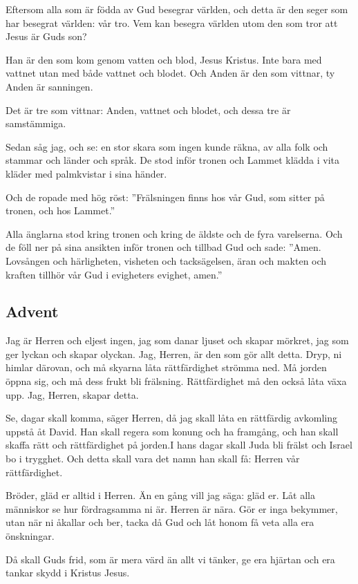 {Eftersom alla som är födda av Gud besegrar världen, och detta är den seger som har besegrat världen: vår tro.
Vem kan besegra världen utom den som tror att Jesus är Guds son?
 
Han är den som kom genom vatten och blod, Jesus Kristus. Inte bara med vattnet utan med både vattnet och blodet. Och Anden är den som vittnar, ty Anden är sanningen.

Det är tre som vittnar:
Anden, vattnet och blodet, och dessa tre är samstämmiga.}

{Sedan såg jag, och se: en stor skara som ingen kunde räkna, av alla folk och stammar och länder och språk. De stod inför tronen och Lammet klädda i vita kläder med palmkvistar i sina händer.

Och de ropade med hög röst: ”Frälsningen finns hos vår Gud, som sitter på tronen, och hos Lammet.”

Alla änglarna stod kring tronen och kring de äldste och de fyra varelserna. Och de föll ner på sina ansikten inför tronen och tillbad Gud
och sade: ”Amen. Lovsången och härligheten, visheten och tacksägelsen, äran och makten och kraften tillhör vår Gud i evigheters evighet, amen.”}



\subsection{Advent}


{Jag är Herren och eljest ingen, jag som danar ljuset och skapar mörkret, jag som ger lyckan och skapar olyckan. Jag, Herren, är den som gör allt detta.
Dryp, ni himlar därovan, och må skyarna låta rättfärdighet strömma ned. Må jorden öppna 
sig, och må dess frukt bli frälsning. Rättfärdighet må den också låta växa upp. Jag, Herren, skapar detta.}


{Se, dagar skall komma, säger Herren, då jag skall låta en rättfärdig avkomling uppstå åt David. Han skall regera som konung och ha framgång, och han skall skaffa rätt och rättfärdighet på jorden.I hans dagar skall Juda bli frälst och Israel bo i trygghet. Och detta skall vara det namn han skall få: Herren vår rättfärdighet.}
 

{Bröder, gläd er alltid i Herren. Än en gång vill jag säga: gläd er. 
 Låt alla människor se hur fördragsamma ni är. Herren är nära. 
 Gör er inga bekymmer, utan när ni åkallar och ber, tacka då Gud och låt honom få veta alla era önskningar. 
 
 Då skall Guds frid, som är mera värd än allt vi tänker, ge era hjärtan och era tankar skydd i Kristus Jesus.}




